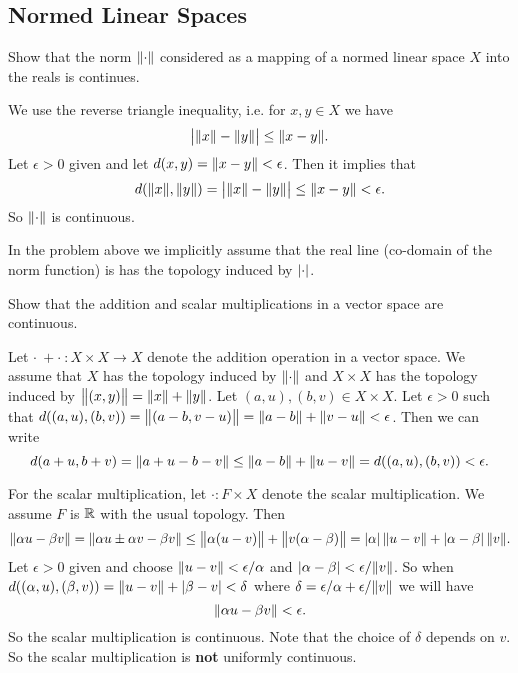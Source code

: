 \subsection{Normed Linear Spaces}
\begin{problem}
	Show that the norm $ \norm{\cdot} $ considered as a mapping of a normed linear space $ X $ into the reals is continues.
\end{problem}

\begin{solution}
	We use the reverse triangle inequality, i.e. for $ x,y \in X $ we have
	\[ \left|\norm{x} - \norm{y}\right| \leq \norm{x-y}. \]
	Let $ \epsilon>0 $ given and let $ d(x,y)=\norm{x-y}<\epsilon $. Then it implies that
	\[ d(\norm{x},\norm{y}) = \left|\norm{x} - \norm{y}\right| \leq \norm{x-y} <\epsilon. \]
	So $ \norm{\cdot} $ is continuous.
\end{solution}
\begin{remark}
	In the problem above we implicitly assume that the real line (co-domain of the norm function) is has the topology induced by $ \left|\cdot\right| $.
\end{remark}

\begin{problem}
	Show that the addition and scalar multiplications in a vector space are continuous.
\end{problem}
\begin{solution}
	Let $ \cdot\ + \cdot\ : X\times X \to X $ denote the addition operation in a vector space. We assume that $ X $ has the topology induced by $ \norm{\cdot} $ and $ X\times X $ has the topology induced by $ \norm{(x,y)} = \norm{x} + \norm{y} $. Let $ (a,u),(b,v)\in X\times X $. Let $ \epsilon>0 $ such that $ d((a,u),(b,v)) = \norm{(a-b,v-u)} = \norm{a-b} + \norm{v-u} < \epsilon $. Then we can write
	\[ d(a+u,b+v) = \norm{a+u-b-v} \leq \norm{a-b}+\norm{u-v} = d((a,u),(b,v))<\epsilon. \]
	
	For the scalar multiplication, let $ \cdot: F\times X $ denote the scalar multiplication. We assume $ F $ is $ \mathbb{R} $ with the usual topology. Then 
	\[ \norm{\alpha u - \beta v} = \norm{\alpha u \pm \alpha v - \beta v} \leq \norm{\alpha(u-v)} + \norm{v(\alpha-\beta)} = \left|\alpha\right|\norm{u-v} + \left|\alpha-\beta\right|\norm{v}. \]
	Let $ \epsilon >0 $ given and choose $ \norm{u-v} < \epsilon/\alpha $ and $ \left|\alpha-\beta\right|<\epsilon/\norm{v} $. So when $ d((\alpha,u),(\beta,v)) = \norm{u-v}+\left|\beta-v\right| < \delta $ where $ \delta = \epsilon/\alpha + \epsilon/\norm{v} $ we will have
	\[ \norm{\alpha u - \beta v} < \epsilon. \] 
	So the scalar multiplication is continuous. Note that the choice of $ \delta $ depends on $ v $. So the scalar multiplication is \textbf{not} uniformly continuous.
\end{solution}

